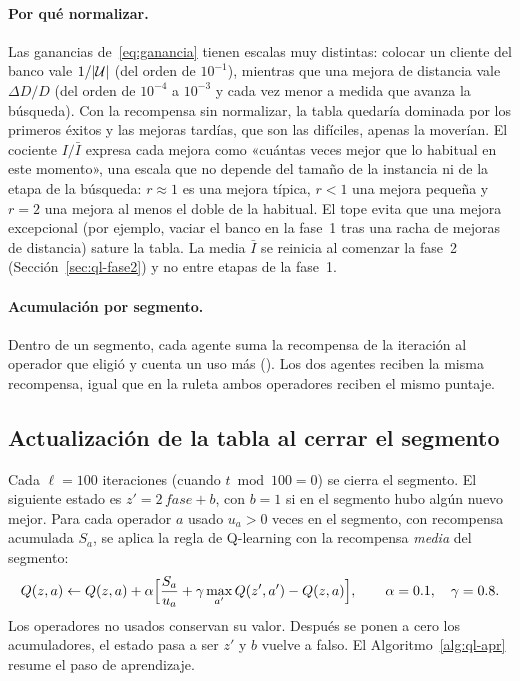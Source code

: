 \paragraph{Por qué normalizar.} Las ganancias de~\eqref{eq:ganancia} tienen escalas muy
distintas: colocar un cliente del banco vale $1/|\mathcal{U}|$ (del orden de $10^{-1}$), mientras que
una mejora de distancia vale $\Delta D/D$ (del orden de $10^{-4}$ a $10^{-3}$ y cada vez menor
a medida que avanza la búsqueda). Con la recompensa sin normalizar, la tabla quedaría dominada
por los primeros éxitos y las mejoras tardías, que son las difíciles, apenas la moverían. El
cociente $I/\bar{I}$ expresa cada mejora como «cuántas veces mejor que lo habitual en este
momento», una escala que no depende del tamaño de la instancia ni de la etapa de la búsqueda:
$r\approx 1$ es una mejora típica, $r<1$ una mejora pequeña y $r=2$ una mejora al menos el
doble de la habitual. El tope evita que una mejora excepcional (por ejemplo, vaciar el banco
en la fase~1 tras una racha de mejoras de distancia) sature la tabla. La media $\bar{I}$ se
reinicia al comenzar la fase~2 (Sección~\ref{sec:ql-fase2}) y no entre etapas de la fase~1.

\paragraph{Acumulación por segmento.} Dentro de un segmento, cada agente suma la recompensa
de la iteración al operador que eligió y cuenta un uso más (). Los dos
agentes reciben la misma recompensa, igual que en la ruleta ambos operadores reciben el mismo
puntaje.

\subsection{Actualización de la tabla al cerrar el segmento}
\label{sec:ql-update}

Cada $\ell=100$ iteraciones (cuando $t\bmod 100=0$) se cierra el segmento. El siguiente estado
es $z'=2\,\textit{fase}+b$, con $b=1$ si en el segmento hubo algún nuevo mejor. Para cada
operador $a$ usado $u_a>0$ veces en el segmento, con recompensa acumulada $S_a$, se aplica la
regla de Q-learning con la recompensa \emph{media} del segmento:
\begin{equation}
Q(z,a)\gets Q(z,a)+\alpha\Bigl[\frac{S_a}{u_a}+\gamma\max_{a'}Q(z',a')-Q(z,a)\Bigr],
\qquad \alpha=0.1,\quad\gamma=0.8 .
\label{eq:qlearning}
\end{equation}
Los operadores no usados conservan su valor. Después se ponen a cero los acumuladores, el
estado pasa a ser $z'$ y $b$ vuelve a falso. El Algoritmo~\ref{alg:ql-apr} resume el paso de
aprendizaje.

